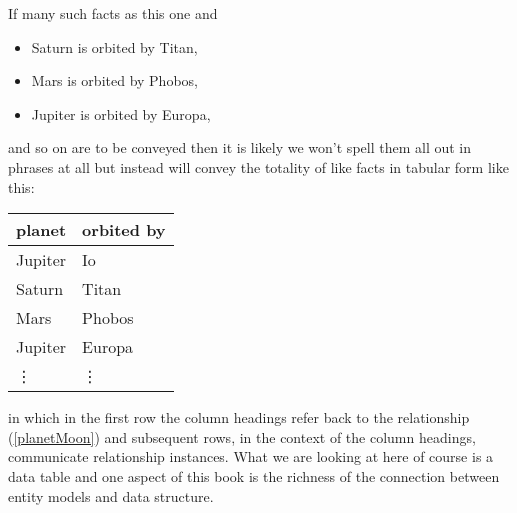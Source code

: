 If many such facts as this one and
\begin{itemize}
\renewcommand\labelitemi{--} 
\item Saturn is orbited by Titan, 
\item Mars is orbited by Phobos, 
\item Jupiter is orbited by Europa,
\end{itemize}
and so on  are to be conveyed then it is likely we won't spell them all out in phrases at all
but instead  will convey the totality of like facts in tabular form like this:
\begin{center}
\begin{tabular}{|l | l|}
\hline
planet & orbited by \\
\hline\hline
Jupiter  & Io \\
\hline
Saturn   & Titan    \\
\hline
Mars     & Phobos    \\
\hline
Jupiter  & Europa         \\
\hline
\vdots    & \vdots  \\
\hline
\end{tabular}
\end{center}
in which in the first row the column headings refer  back to the relationship (\ref{planetMoon})
and subsequent rows, in the context of the column headings, communicate relationship instances. 
What we are looking at here of course is a data table and one aspect of this book 
is the richness of the connection between  entity models and data structure.

